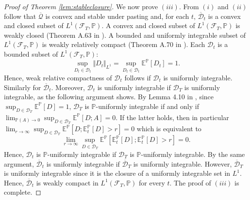 \documentclass[11pt,a4paper]{article}
\newcommand{\E}{\mathbb{E}}
\renewcommand{\P}{\mathbb{P}}
\newcommand{\calF}{\mathcal{F}}
\newcommand{\calQ}{\mathcal{Q}}
\newcommand{\calD}{\mathcal{D}}
\begin{document}
\begin{proof}[Proof of Theorem \ref{lem:stableclosure}]
We now prove $(iii)$. From $(i)$ and $(ii)$ follow that $\overline{\calQ}$ is convex and stable under pasting and, for each $t$, $\overline{\calD}_{t}$ is a convex and closed subset of $L^1(\calF_T,\P)$. A convex and closed subset of $L^1(\calF_T,\P)$ is weakly closed (Theorem A.63 in \cite{Foellmer-Schied-16}). A bounded and uniformly integrable subset of $L^1(\calF_T,\P)$ is weakly relatively compact (Theorem A.70 in \cite{Foellmer-Schied-16}). 
Each $\calD_{t}$ is a bounded subset of $L^1(\calF_T,\P)$:
$$
\sup_{D_t\in \calD_{t}}\Vert D_t\Vert_{L^1}=\sup_{D_t\in \calD_{t}}\E^{\P}[D_t]=1.
$$
Hence, weak relative compactness of $\calD_{t}$ follows if $\calD_{t}$ is uniformly integrable. 
Similarly for $\overline{\calD}_{t}$. 
Moreover, $\calD_{t}$ is uniformly integrable if $\calD_{T}$ is uniformly integrable, as the following argument shows. 
By Lemma 4.10 in \cite{Kallenberg-02}, since $\sup_{D\in \calD_{T}}\E^{\P}[D]=1$, $\calD_{T}$ is $\P$-uniformly integrable if and only if $\lim_{\P(A)\to 0}\sup_{D\in \calD_{T}}\E^{\P}[D;A]=0$. If the latter holds, then in particular
$\lim_{r\to\infty}\sup_{D\in \calD_{T}}\E^{\P}[D;\E^{\P}_t[D]>r]=0$ which is equivalent to 
$$
\lim_{r\to\infty}\sup_{D\in \calD_{T}}\E^{\P}[\E^{\P}_t[D];\E^{\P}_t[D]>r]=0.
$$ 
Hence, $\calD_{t}$ is $\P$-uniformly integrable if $\calD_{T}$ is $\P$-uniformly integrable.
By the same argument, $\overline{\calD}_{t}$ is uniformly integrable if $\overline{\calD}_{T}$ is uniformly integrable. 
However, $\overline{\calD}_{T}$ is uniformly integrable since it is the closure of a uniformly integrable set in $L^1$. 
Hence, $\overline{\calD}_{t}$ is weakly compact in $L^1(\calF_T,\P)$ for every $t$. 
The proof of $(iii)$ is complete.


\end{proof}
\end{document}
